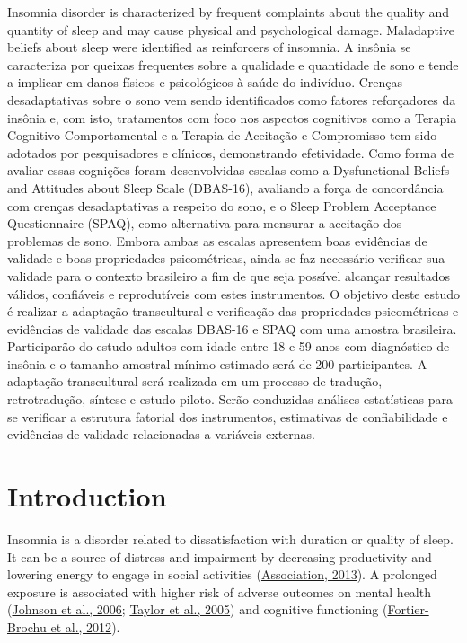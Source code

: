 \documentclass[
  ,doc,11pt, twoside,floatsintext]{apa6}
\begin{document}
Insomnia disorder is characterized by frequent complaints about the quality and quantity of sleep and may cause physical and psychological damage. Maladaptive beliefs about sleep were identified as reinforcers of insomnia. A insônia se caracteriza por queixas frequentes sobre a qualidade e quantidade de sono e tende a implicar em danos físicos e psicológicos à saúde do indivíduo. Crenças desadaptativas sobre o sono vem sendo identificados como fatores reforçadores da insônia e, com isto, tratamentos com foco nos aspectos cognitivos como a Terapia Cognitivo-Comportamental e a Terapia de Aceitação e Compromisso tem sido adotados por pesquisadores e clínicos, demonstrando efetividade. Como forma de avaliar essas cognições foram desenvolvidas escalas como a Dysfunctional Beliefs and Attitudes about Sleep Scale (DBAS-16), avaliando a força de concordância com crenças desadaptativas a respeito do sono, e o Sleep Problem Acceptance Questionnaire (SPAQ), como alternativa para mensurar a aceitação dos problemas de sono. Embora ambas as escalas apresentem boas evidências de validade e boas propriedades psicométricas, ainda se faz necessário verificar sua validade para o contexto brasileiro a fim de que seja possível alcançar resultados válidos, confiáveis e reprodutíveis com estes instrumentos. O objetivo deste estudo é realizar a adaptação transcultural e verificação das propriedades psicométricas e evidências de validade das escalas DBAS-16 e SPAQ com uma amostra brasileira. Participarão do estudo adultos com idade entre 18 e 59 anos com diagnóstico de insônia e o tamanho amostral mínimo estimado será de 200 participantes. A adaptação transcultural será realizada em um processo de tradução, retrotradução, síntese e estudo piloto. Serão conduzidas análises estatísticas para se verificar a estrutura fatorial dos instrumentos, estimativas de confiabilidade e evidências de validade relacionadas a variáveis externas.

\newpage

\hypertarget{introduction}{%
\section{Introduction}\label{introduction}}

Insomnia is a disorder related to dissatisfaction with duration or quality of sleep. It can be a source of distress and impairment by decreasing productivity and lowering energy to engage in social activities (\protect\hyperlink{ref-americanpsychiatricassociation2013}{Association, 2013}). A prolonged exposure is associated with higher risk of adverse outcomes on mental health (\protect\hyperlink{ref-johnson2006}{Johnson et al., 2006}; \protect\hyperlink{ref-taylor2005}{Taylor et al., 2005}) and cognitive functioning (\protect\hyperlink{ref-fortier-brochu2012}{Fortier-Brochu et al., 2012}).
\end{document}
